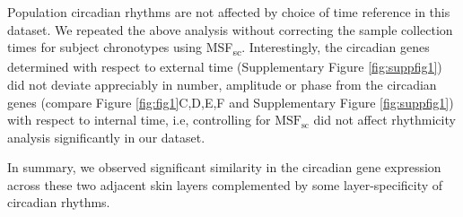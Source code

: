Population circadian rhythms are not affected by choice of time reference in this dataset. We repeated the above analysis without correcting the sample collection times for subject chronotypes using MSF\textsubscript{sc}. Interestingly, the circadian genes determined with respect to external time (Supplementary Figure \ref{fig:suppfig1}) did not deviate appreciably in number, amplitude or phase from the circadian genes (compare Figure \ref{fig:fig1}C,D,E,F and Supplementary Figure \ref{fig:suppfig1}) with respect to internal time, i.e, controlling for $\textrm{MSF}_\textrm{sc}$ did not affect rhythmicity analysis significantly in our dataset.

In summary, we observed significant similarity in the circadian gene expression across these two adjacent skin layers complemented by some layer-specificity of circadian rhythms. 



